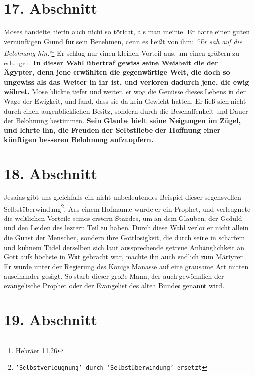 \section{17. Abschnitt} \label{kap4_ab17}

\label{ref:04_17_mose}
Moses handelte hierin auch nicht so töricht, als man meinte. Er hatte einen
guten vernünftigen Grund für sein Benehmen, denn es heißt von ihm:
\textit{"`Er sah auf die Belohnung hin."'}\footnote{Hebräer 11,26}
Er schlug nur einen kleinen
Vorteil aus, um einen größern zu erlangen. \textbf{In dieser Wahl übertraf
gewiss seine
Weisheit die der Ägypter, denn jene erwählten die gegenwärtige Welt, die doch so
ungewiss als das Wetter in ihr ist, und verloren dadurch jene, die ewig währet.}
Mose blickte tiefer und weiter, er wog die Genüsse dieses Lebens in der Wage der
Ewigkeit,  und fand, dass sie da kein Gewicht hatten. Er
ließ sich nicht durch
einen augenblicklichen Besitz, sondern durch die Beschaffenheit und Dauer der
Belohnung bestimmen. \textbf{Sein Glaube hielt seine Neigungen im Zügel, und
lehrte ihn,
die Freuden der Selbstliebe der Hoffnung einer künftigen besseren Belohnung
aufzuopfern.}

\section{18. Abschnitt} \label{kap4_ab18}

 Jesaias gibt uns gleichfalls ein nicht unbedeutendes
Beispiel dieser
segensvollen Selbstüberwindung\footnote{\texttt{'Selbstverleugnung' durch
'Selbstüberwindung' ersetzt}}. Aus einem Hofmanne wurde er ein Prophet, und
verleugnete die weltlichen Vorteile seines erstern Standes, um an dem Glauben,
der Geduld und den Leiden des leztern Teil zu haben. Durch diese Wahl verlor er
nicht allein die Gunst der Menschen, sondern ihre Gottlosigkeit, die durch seine
in scharfem und kühnem Tadel derselben sich laut aussprechende getreue
Anhänglichkeit an Gott aufs höchste in Wut gebracht war, machte ihn auch
endlich zum Märtyrer . Er wurde unter der Regierung
des Könige
Manasse  auf eine
grausame Art mitten auseinander gesägt. So starb dieser große Mann, der auch
gewöhnlich der evangelische Prophet oder der Evangelist des alten
Bundes genannt wird.

\section{19. Abschnitt} \label{kap4_ab19}

